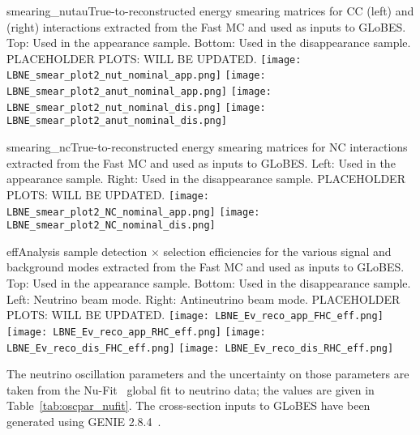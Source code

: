 \begin{cdrfigure}{smearing_nutau}{True-to-reconstructed energy smearing matrices for CC \nutau (left) and \anutau (right) interactions extracted from the Fast MC and used as inputs to GLoBES.  Top: Used in the appearance sample.  Bottom: Used in the disappearance sample. PLACEHOLDER PLOTS: WILL BE UPDATED.}
 \texttt{[image: LBNE\_smear\_plot2\_nut\_nominal\_app.png]}
 \texttt{[image: LBNE\_smear\_plot2\_anut\_nominal\_app.png]}
 \texttt{[image: LBNE\_smear\_plot2\_nut\_nominal\_dis.png]}
 \texttt{[image: LBNE\_smear\_plot2\_anut\_nominal\_dis.png]}
\end{cdrfigure}

\begin{cdrfigure}{smearing_nc}{True-to-reconstructed energy smearing matrices for NC interactions extracted from the Fast MC and used as inputs to GLoBES.  Left: Used in the appearance sample.  Right: Used in the disappearance sample. PLACEHOLDER PLOTS: WILL BE UPDATED.}
 \texttt{[image: LBNE\_smear\_plot2\_NC\_nominal\_app.png]}
 \texttt{[image: LBNE\_smear\_plot2\_NC\_nominal\_dis.png]}
\end{cdrfigure}

\begin{cdrfigure}{eff}{Analysis sample detection $\times$ selection efficiencies for the various signal and background modes extracted from the Fast MC and used as inputs to GLoBES.  Top: Used in the appearance sample. Bottom: Used in the disappearance sample.  Left: Neutrino beam mode.  Right: Antineutrino beam mode. PLACEHOLDER PLOTS: WILL BE UPDATED.}
 \texttt{[image: LBNE\_Ev\_reco\_app\_FHC\_eff.png]}
 \texttt{[image: LBNE\_Ev\_reco\_app\_RHC\_eff.png]}
 \texttt{[image: LBNE\_Ev\_reco\_dis\_FHC\_eff.png]}
 \texttt{[image: LBNE\_Ev\_reco\_dis\_RHC\_eff.png]}
\end{cdrfigure}

The neutrino oscillation parameters and the uncertainty on those parameters are taken from the 
Nu-Fit~\cite{Gonzalez-Garcia:2014bfa} global fit to neutrino data; the values are given in 
Table~\ref{tab:oscpar_nufit}.  The cross-section inputs to GLoBES have been generated using GENIE 2.8.4~\cite{Andreopoulos:2009rq}.

